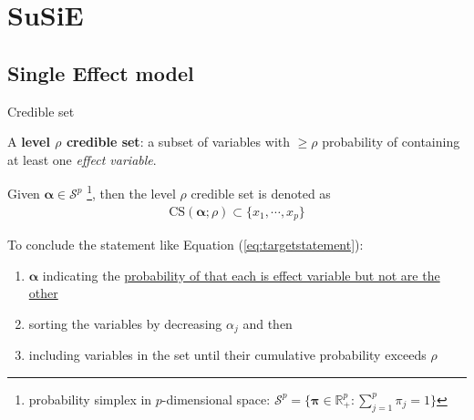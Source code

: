 \documentclass[10pt]{beamer}
\begin{document}



\section{SuSiE}

\subsection{Single Effect model}

\begin{frame}{Credible set}
    \begin{definition}
        A \textbf{level $\rho$ credible set}: a subset of variables with $\geq \rho$ probability of containing at least one \textit{effect variable}.
    \end{definition}

    \bigskip
    
    Given $\bm{\alpha}\in\mathcal{S}^p$ 
    \footnote{probability simplex in $p$-dimensional space: 
    $\mathcal{S}^p=\{\bm{\pi}\in\mathbb{R}^p_+:\sum_{j=1}^p\pi_j=1\}$}, 
    then the level $\rho$ credible set is denoted as 
    \begin{gather}
        \text{CS}(\bm{\alpha};\rho)
        \subset \{x_1,\cdots,x_p\}
    \end{gather}

    To conclude the statement like Equation (\ref{eq:targetstatement}):
    \begin{enumerate}
        \item $\bm{\alpha}$ indicating the \uline{probability of that each 
        is effect variable but not are the other}
        \item sorting the variables by decreasing $\alpha_j$ and then 
        \item including variables in the set until their cumulative probability exceeds $\rho$
    \end{enumerate}
\end{frame}
\end{document}
